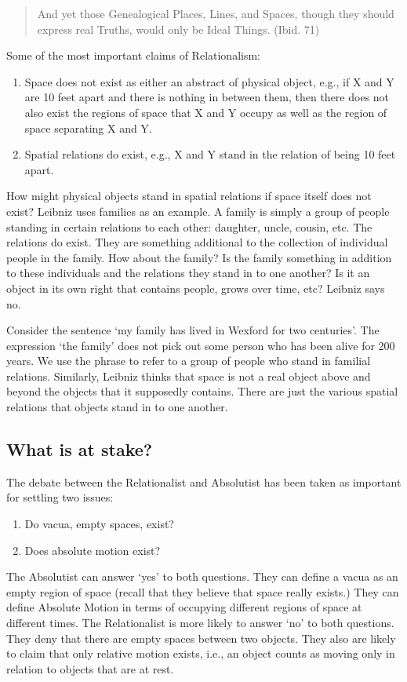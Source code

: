 \documentclass[oneside]{article}
\begin{document}
\begin{quote}
And yet those Genealogical Places, Lines, and Spaces, though they should
express real Truths, would only be Ideal Things. (Ibid. 71)
\end{quote}
Some of the most important claims of Relationalism:
\begin{enumerate}
\item Space does not exist as either an abstract of physical object, e.g., if X and Y are 10 feet apart and there is nothing in between
them, then there does not also exist the regions of
space that X and Y occupy as well as the region of space separating X and Y.
\item Spatial relations do exist, e.g., X and Y stand in the relation of being 10 feet apart.
\end{enumerate}
How might physical objects stand in spatial relations if space itself does not exist? Leibniz uses families as an example. A family is simply a group of people standing in certain relations to
each other: daughter, uncle, cousin, etc. The relations do exist. They are something
additional to the collection of individual people in the family. How about the family? Is the family
something in addition to these individuals and the relations they stand in to one another? Is it an
object in its own right that contains people, grows over time, etc? Leibniz says no.

Consider the sentence `my family has lived in Wexford for two
centuries'. The expression `the family' does not pick out some person
who has been alive for 200 years. We use the phrase to refer to a group
of people who stand in familial relations. Similarly, Leibniz thinks
that space is not a real object above and beyond the objects that it
supposedly contains. There are just the various spatial relations that
objects stand in to one another.



\subsection*{What is at stake?}\label{what-is-at-stake}

The debate between the Relationalist and Absolutist has been taken as
important for settling two issues:

\begin{enumerate}
\item
  Do vacua, empty spaces, exist?
\item
  Does absolute motion exist? 
\end{enumerate}
The Absolutist can answer `yes' to both questions. They can define a
vacua as an empty region of space (recall that they believe that space
really exists.) They can define Absolute Motion in terms of occupying
different regions of space at different times. The Relationalist is more
likely to answer `no' to both questions. They deny that there are empty spaces between two objects. They also are likely to claim that only relative motion exists, i.e., an object counts as moving only in relation to objects that are at rest.
\end{document}
